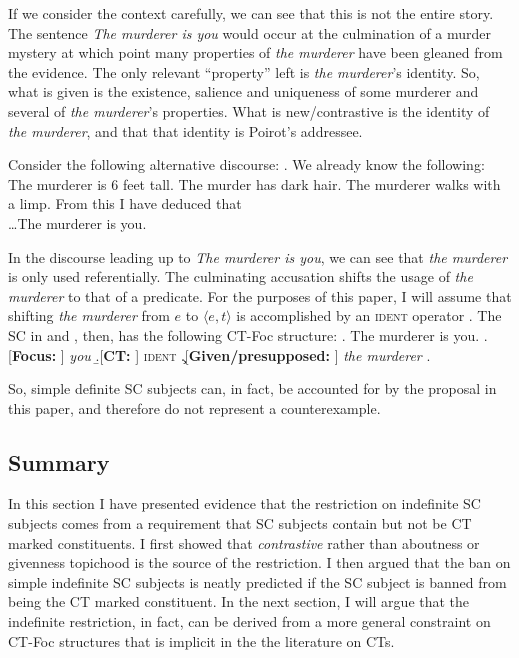 \documentclass[GPFinal]{subfiles}
\begin{document}
If we consider the context carefully, we can see that this is not the entire story.
The sentence \textit{The murderer is you} would occur at the culmination of a murder mystery at which point many properties of \textit{the murderer} have been gleaned from the evidence.
The only relevant ``property'' left is \textit{the murderer}'s identity.
So, what is given is the existence, salience and uniqueness of  some murderer and several of \textit{the murderer}'s properties.
What is new/contrastive is the identity of \textit{the murderer}, and that that identity is Poirot's addressee.

Consider the following alternative discourse:
\ex. We already know the following: The murderer is 6 feet tall. The murder has dark hair. The murderer walks with a limp. From this I have deduced that \\
\ldots The murderer is you.

In the discourse leading up to \textit{The murderer is you}, we can see that \textit{the murderer} is only used referentially.
The culminating accusation shifts the usage of \textit{the murderer} to that of a predicate.
For the purposes of this paper, I will assume that shifting \textit{the murderer} from $e$ to $\langle e, t\rangle$ is accomplished by an \textsc{ident} operator \parencite[cf.][]{partee1987noun}.
The SC in \Last and \LLast, then, has the following CT-Foc structure:
\ex. The murderer is you.
\a.[\textbf{Focus: }] \textit{you}
\b.[\textbf{CT: }] \textsc{ident}
\c.[\textbf{Given/presupposed:} ] \textit{the murderer}
\z.

So, simple definite SC subjects can, in fact, be accounted for by the proposal in this paper, and therefore do not represent a counterexample.
\subsection{Summary}
In this section I have presented evidence that the restriction on indefinite SC subjects comes from a requirement that SC subjects contain but not be CT marked constituents.
I first showed that \textit{contrastive} rather than aboutness or givenness topichood is the source of the restriction.
I then argued that the ban on simple indefinite SC subjects is neatly predicted if the SC subject is banned from being the CT marked constituent.
In the next section, I will argue that the indefinite restriction, in fact, can be derived from a more general constraint on CT-Foc structures that is implicit in the the literature on CTs.
\end{document}
